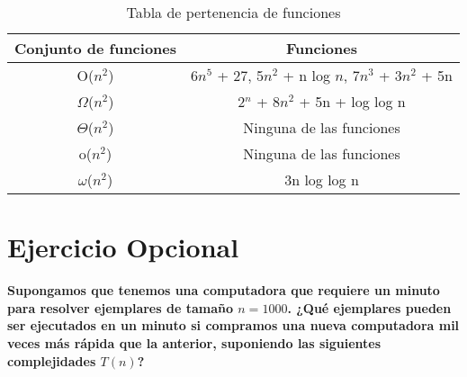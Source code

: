 \begin{table}[htbp]
	\centering
	\caption{Tabla de pertenencia de funciones}
	\begin{tabular}{|c|c|}
		\hline
        Conjunto de funciones        & Funciones \\ \hline
        \rowcolor[HTML]{FFECEC}
	    O($n^2$)        & 6$n^5$ + 27, 5$n^2$ + n log $n$, 7$n^3$ + 3$n^2$ + 5n \\ \hline
		\rowcolor[HTML]{FFF2CC}
	    $\Omega$($n^2$) & 2$^n$ + 8$n^2$ + 5n + log log n                       \\ \hline
		\rowcolor[HTML]{D0ECE7}
	    $\Theta$($n^2$) & Ninguna de las funciones                              \\ \hline
		\rowcolor[HTML]{D0E8F9}
	    o($n^2$)        & Ninguna de las funciones                              \\ \hline
		\rowcolor[HTML]{F9D0E8}
	    $\omega$($n^2$) & 3n log log n                                          \\ \hline
	\end{tabular}
\end{table}

\section{Ejercicio Opcional}

\textbf{Supongamos que tenemos una computadora que requiere un minuto para
	resolver ejemplares de tamaño $n=1000$. ¿Qué ejemplares pueden ser ejecutados en un
	minuto si compramos una nueva computadora mil veces más rápida que la anterior,
	suponiendo las siguientes complejidades $T(n)$?}

